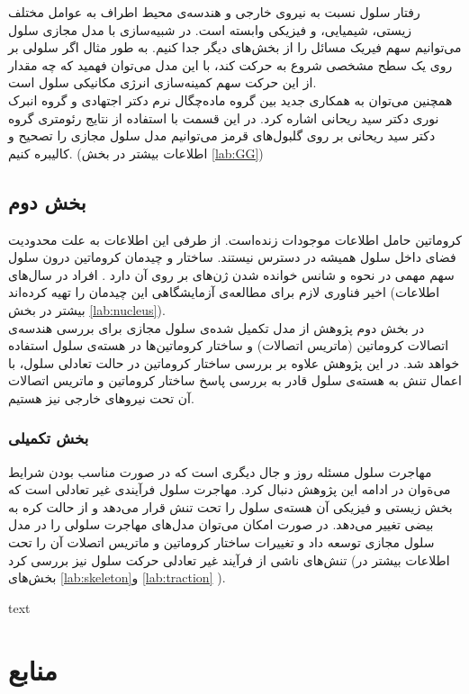 رفتار سلول نسبت به نیروی خارجی و هندسه‌ی محیط اطراف به عوامل مختلف زیستی، شیمیایی، و فیزیکی وابسته است. در شبیه‌سازی با مدل مجازی سلول می‌توانیم سهم فیریک مسائل را از بخش‌های دیگر جدا کنیم. به طور مثال اگر سلولی بر روی یک سطح مشخصی شروع به حرکت کند، با این مدل می‌توان فهمید که چه مقدار از این حرکت سهم کمینه‌سازی انرژی مکانیکی سلول است. \\


همچنین می‌توان به همکاری جدید بین گروه‌ ماده‌چگال نرم دکتر اجتهادی و گروه انبرک نوری دکتر سید ریحانی اشاره کرد. در این قسمت با استفاده از نتایج رئومتری گروه دکتر سید ریحانی بر روی گلبول‌های قرمز می‌توانیم مدل سلول مجازی را تصحیح و کالیبره کنیم. (اطلاعات بیشتر در بخش \ref{lab:GG})
\subsection{بخش دوم}
کروماتین حامل اطلاعات موجودات زنده‌است. از طرفی این اطلاعات به علت محدودیت فضای داخل سلول همیشه در دسترس نیستند. ساختار و چیدمان کروماتین درون سلول سهم مهمی در نحوه و شانس خوانده شدن ژن‌های بر روی آن دارد . افراد در سال‌های اخیر فناوری لازم برای مطالعه‌ی آزمایشگاهی این چیدمان را تهیه کرده‌اند (اطلاعات بیشتر در بخش \ref{lab:nucleus}). \\

در بخش دوم پژوهش از مدل تکمیل شده‌ی سلول مجازی برای بررسی هندسه‌ی اتصالات کروماتین (ماتریس اتصالات) و ساختار کروماتین‌ها در هسته‌ی سلول استفاده خواهد شد. در این پژوهش علاوه بر بررسی ساختار کروماتین‌ در حالت تعادلی سلول، با اعمال تنش به هسته‌ی سلول قادر به  بررسی پاسخ ساختار کروماتین و ماتریس اتصالات آن تحت نیرو‌های خارجی نیز هستیم.

\subsubsection{بخش تکمیلی}
مهاجرت سلول مسئله روز و جال دیگری است که در صورت مناسب بودن شرایط می‌ةوان در ادامه این پژوهش دنبال کرد. مهاجرت سلول فرآیندی غیر تعادلی است که بخش زیستی و فیزیکی آن هسته‌ی سلول را تحت تنش قرار می‌دهد و از حالت کره به بیضی تغییر می‌دهد. در صورت امکان می‌توان مدل‌های مهاجرت سلولی را در مدل سلول مجازی توسعه داد و تغییرات ساختار کروماتین و ماتریس اتصلات آن را تحت تنش‌های ناشی از فرآیند غیر تعادلی حرکت سلول نیز بررسی کرد (اطلاعات بیشتر در بخش‌های \ref{lab:skeleton}و \ref{lab:traction}  ).

text\cite{Dekker:2017rt}\cite{Tee:2015gf}\cite{Gerlitz:2011bh}\cite{Shi:2018uo}\cite{10.3389/fnins.2017.00559}\cite{Shaebani:2017xy}\cite{C6RA23012A}

\clearpage
\section{منابع}

\unsetRL
 



	        
	       